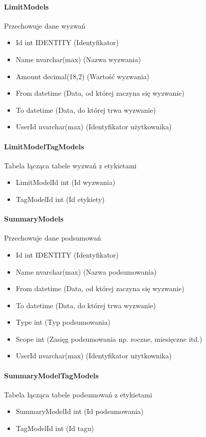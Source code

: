 \documentclass[10pt,titlepage]{article}
\begin{document}
\paragraph[short]{LimitModels}
Przechowuje dane wyzwań
\begin{itemize}
  \item Id int IDENTITY (Identyfikator)
  \item Name nvarchar(max) (Nazwa wyzwania)
  \item Amount decimal(18,2) (Wartość wyzwania)
  \item From datetime (Data, od której zaczyna się wyzwanie)
  \item To datetime (Data, do której trwa wyzwanie)
  \item UserId nvarchar(max) (Identyfikator użytkownika)
\end{itemize}
\paragraph[short]{LimitModelTagModels}
Tabela łącząca tabele wyzwań z etykietami
\begin{itemize}
  \item LimitModelId int (Id wyzwania)
  \item TagModelId int (Id etykiety)
\end{itemize}
\paragraph[short]{SummaryModels}
Przechowuje dane podsumowań
\begin{itemize}
  \item Id int IDENTITY (Identyfikator)
  \item Name nvarchar(max) (Nazwa podsumowania)
  \item From datetime (Data, od której zaczyna się wyzwanie)
  \item To datetime (Data, do której trwa wyzwanie)
  \item Type int (Typ podsumowania)
  \item Scope int (Zasięg podsumowania np. roczne, miesięczne itd.)
  \item UserId nvarchar(max) (Identyfikator użytkownika)
\end{itemize}
\paragraph[short]{SummaryModelTagModels}
Tabela łącząca tabele podsumowań z etykietami
\begin{itemize}
  \item SummaryModelId int (Id podsumowania)
  \item TagModelId int (Id tagu)
\end{itemize}
\end{document}
